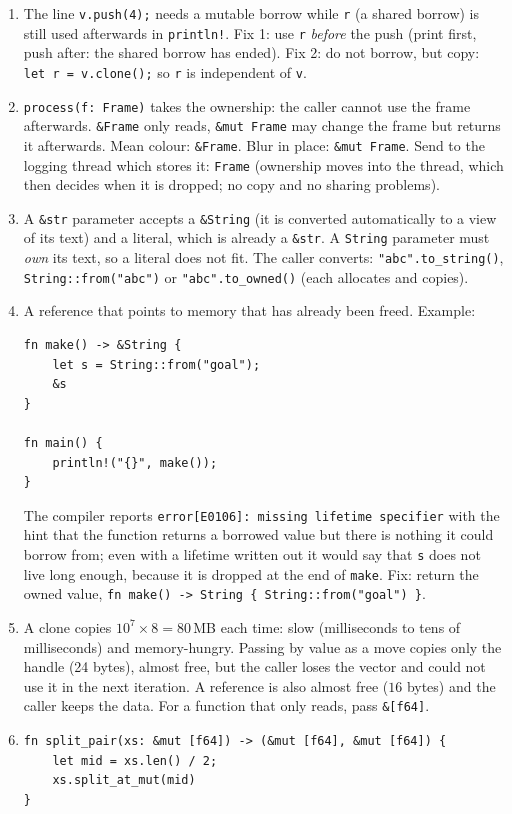 \begin{enumerate}[label=\textbf{\ansnum.\arabic*}]
\begin{verbatim}
fn main() {
    let mut v = vec![-2.0, 0.5, 3.0];
    clamp_all(&mut v, -1.0, 1.0);
    println!("{:?}", v);
}
\end{verbatim}
prints \verb![-1.0, 0.5, 1.0]!.
  \item The line \verb!v.push(4);! needs a mutable borrow while \verb!r! (a shared borrow) is still used afterwards in \verb|println!|. Fix 1: use \verb!r! \emph{before} the push (print first, push after: the shared borrow has ended). Fix 2: do not borrow, but copy: \verb!let r = v.clone();! so \verb!r! is independent of \verb!v!.
  \item \verb!process(f: Frame)! takes the ownership: the caller cannot use the frame afterwards. \verb!&Frame! only reads, \verb!&mut Frame! may change the frame but returns it afterwards. Mean colour: \verb!&Frame!. Blur in place: \verb!&mut Frame!. Send to the logging thread which stores it: \verb!Frame! (ownership moves into the thread, which then decides when it is dropped; no copy and no sharing problems).
  \item A \verb!&str! parameter accepts a \verb!&String! (it is converted automatically to a view of its text) and a literal, which is already a \verb!&str!. A \verb!String! parameter must \emph{own} its text, so a literal does not fit. The caller converts: \verb!"abc".to_string()!, \verb!String::from("abc")! or \verb!"abc".to_owned()! (each allocates and copies).
  \item A reference that points to memory that has already been freed. Example:
\begin{verbatim}
fn make() -> &String {
    let s = String::from("goal");
    &s
}

fn main() {
    println!("{}", make());
}
\end{verbatim}
The compiler reports \verb!error[E0106]: missing lifetime specifier! with the hint that the function returns a borrowed value but there is nothing it could borrow from; even with a lifetime written out it would say that \verb!s! does not live long enough, because it is dropped at the end of \verb!make!. Fix: return the owned value, \verb!fn make() -> String { String::from("goal") }!.
  \item A clone copies $10^7\times8=80$\,MB each time: slow (milliseconds to tens of milliseconds) and memory-hungry. Passing by value as a move copies only the handle (24 bytes), almost free, but the caller loses the vector and could not use it in the next iteration. A reference is also almost free ($16$ bytes) and the caller keeps the data. For a function that only reads, pass \verb!&[f64]!.
  \item
\begin{verbatim}
fn split_pair(xs: &mut [f64]) -> (&mut [f64], &mut [f64]) {
    let mid = xs.len() / 2;
    xs.split_at_mut(mid)
}


\end{verbatim}
\end{enumerate}
